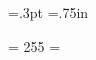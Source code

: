 %
\def\smallbreak{\ifnum\lastpenalty<10000\par\ifdim\lastskip<\smallskipamount
  \removelastskip\penalty-50\smallskip\fi\fi}
\def\medbreak{\ifnum\lastpenalty<10000\par\ifdim\lastskip<\medskipamount
  \removelastskip\penalty-100\medskip\fi\fi}
\def\bigbreak{\ifnum\lastpenalty<10000\par\ifdim\lastskip<\bigskipamount
  \removelastskip\penalty-200\bigskip\fi\fi}

%
\newif\ifcropmarks
\let\cropmarks = \cropmarkstrue
%
%
\newdimen\outerhsize \newdimen\outervsize %
\newdimen\cornerlong  \cornerlong=1pc
\newdimen\cornerthick \cornerthick=.3pt
\newdimen\topandbottommargin \topandbottommargin=.75in

\chardef\PAGE = 255
\output = {\onepageout{\pagecontents\PAGE}}

\newbox\headlinebox
\newbox\footlinebox

